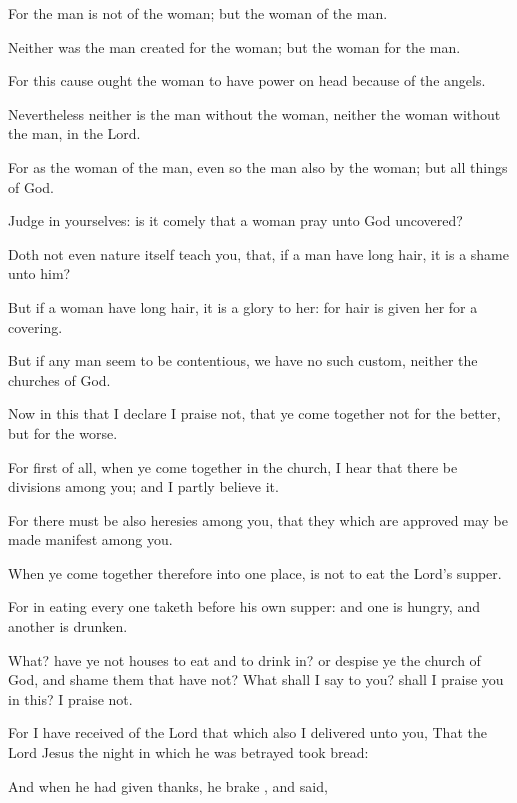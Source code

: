 {For the
man
is
not
of the
woman;
but the
woman
of the
man.

Neither
was the
man
created
for the
woman;
but the
woman
for the
man.

For this
cause
ought the
woman to
have
power
on
{}
head because
of the
angels.

Nevertheless
neither is the
man
without the
woman,
neither the
woman
without the
man,
in the
Lord.

For
as the
woman
{}
of the
man, even
so
{} the
man
also
by the
woman;
but all
things
of
God.

Judge
in
yourselves: is
it
comely that a
woman
pray unto
God
uncovered?

Doth
not
even
nature
itself
teach
you,
that,
if a
man have long
hair, it
is a
shame unto
him?

But
if a
woman have long
hair, it
is a
glory to
her:
for
{}
hair is
given
her
for a
covering.

But
if any
man
seem to
be
contentious,
we
have
no
such
custom,
neither the
churches of
God.


\par }{\PP {}Now in
this that I
declare
{} I
praise
{}
not,
that ye come
together
not
for the
better,
but
for the
worse.

For first of
all,
when
ye come
together
in the
church, I
hear that there
be
divisions
among
you;
and
I
partly
believe
it.

For
there
must
be
also
heresies
among
you,
that they
which are
approved may be
made
manifest
among
you.

When
ye come
together
therefore
into one
place,
{}
is
not to
eat the
Lord’s
supper.

For
in
eating every
one taketh
before
{} his
own
supper:
and
one is
hungry,
and
another is
drunken.

What? have
ye
not
houses
to
eat
and to drink
in?
or despise
ye the
church of
God,
and
shame
them that
have
not?
What shall I
say to
you? shall I
praise
you
in
this? I
praise
{}
not.

For
I have
received
of the
Lord that
which
also I
delivered unto
you,
That the
Lord
Jesus the
{}
night
in
which he was
betrayed
took
bread:

And when he had given
thanks, he
brake
{},
and
said,
{}

}
